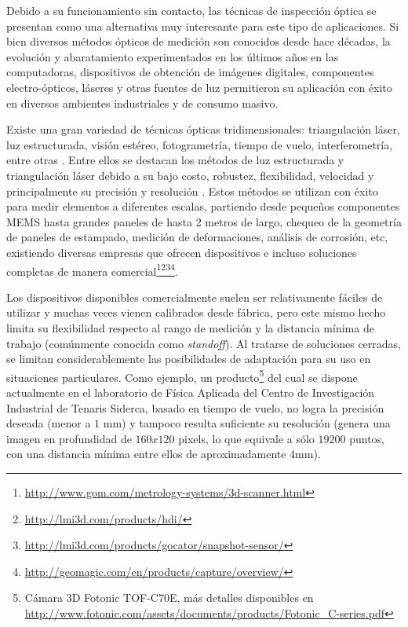 Debido a su funcionamiento sin contacto, las técnicas de inspección óptica se presentan como una alternativa muy interesante para este tipo de aplicaciones. Si bien diversos métodos ópticos de medición son conocidos desde hace décadas, la evolución y abaratamiento experimentados en los últimos años en las computadoras, dispositivos de obtención de imágenes digitales, componentes electro-ópticos, láseres y otras fuentes de luz permitieron su aplicación con éxito en diversos ambientes industriales y de consumo masivo.

Existe una gran variedad de técnicas ópticas tridimensionales: triangulación láser, luz estructurada, visión estéreo, fotogrametría, tiempo de vuelo, interferometría, entre otras \cite{sansoni2009state}. Entre ellos se destacan los métodos de luz estructurada y triangulación láser debido a su bajo costo, robustez, flexibilidad, velocidad y principalmente su precisión y resolución \cite{gorthi2010fringe}. Estos métodos se utilizan con éxito para medir elementos a diferentes escalas, partiendo desde pequeños componentes \ac{MEMS} hasta grandes paneles de hasta 2 metros de largo, chequeo de la geometría de paneles de estampado, medición de deformaciones, análisis de corrosión, etc, existiendo diversas empresas que ofrecen dispositivos e incluso soluciones completas de manera comercial\footnote{\url{http://www.gom.com/metrology-systems/3d-scanner.html}}\footnote{\url{http://lmi3d.com/products/hdi/}}\footnote{\url{http://lmi3d.com/products/gocator/snapshot-sensor/}}\footnote{\url{http://geomagic.com/en/products/capture/overview/}}.


Los dispositivos disponibles comercialmente suelen ser relativamente fáciles de utilizar y muchas veces vienen calibrados desde fábrica, pero este mismo hecho limita su flexibilidad respecto al rango de medición y la distancia mínima de trabajo (comúnmente conocida como \emph{standoff}). Al tratarse de soluciones cerradas, se limitan considerablemente las posibilidades de adaptación para su uso en situaciones particulares. Como ejemplo, un producto\footnote{Cámara 3D Fotonic TOF-C70E, más detalles disponibles en \url{http://www.fotonic.com/assets/documents/products/Fotonic_C-series.pdf}} del cual se dispone actualmente en el laboratorio de Física Aplicada del Centro de Investigación Industrial de Tenaris Siderca, basado en tiempo de vuelo, no logra la precisión deseada (menor a $1$ mm) y tampoco resulta suficiente su resolución (genera una imagen en profundidad de $160x120$ pixels, lo que equivale a sólo $19200$ puntos, con una distancia mínima entre ellos de aproximadamente $4$mm).

